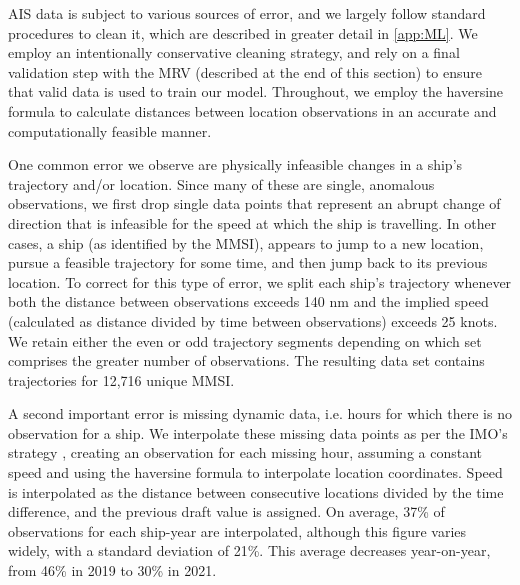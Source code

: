 \ac{AIS} data is subject to various sources of error, and we largely follow standard procedures to clean it, which are described in greater detail in \autoref{app:ML}. We employ an intentionally conservative cleaning strategy, and rely on a final validation step with the \ac{MRV} (described at the end of this section) to ensure that valid data is used to train our model. Throughout, we employ the haversine formula to calculate distances between location observations in an accurate and computationally feasible manner.

One common error we observe are physically infeasible changes in a ship's trajectory and/or location. Since many of these are single, anomalous observations, we first drop single data points that represent an abrupt change of direction that is infeasible for the speed at which the ship is travelling. In other cases, a ship (as identified by the \ac{MMSI}), appears to jump to a new location, pursue a feasible trajectory for some time, and then jump back to its previous location. To correct for this type of error, we split each ship's trajectory whenever both the distance between observations exceeds 140 \ac{nm} and the implied speed (calculated as distance divided by time between observations) exceeds 25 knots. We retain either the even or odd trajectory segments depending on which set comprises the greater number of observations. The resulting data set contains trajectories for 12,716 unique \ac{MMSI}.

A second important error is missing dynamic data, i.e. hours for which there is no observation for a ship. We interpolate these missing data points as per the \ac{IMO}'s strategy \parencite{faber2020fourth}, creating an observation for each missing hour, assuming a constant speed and using the haversine formula to interpolate location coordinates. Speed is interpolated as the distance between consecutive locations divided by the time difference, and the previous draft value is assigned. On average, 37\% of observations for each ship-year are interpolated, although this figure varies widely, with a standard deviation of 21\%. This average decreases year-on-year, from 46\% in 2019 to 30\% in 2021. 

